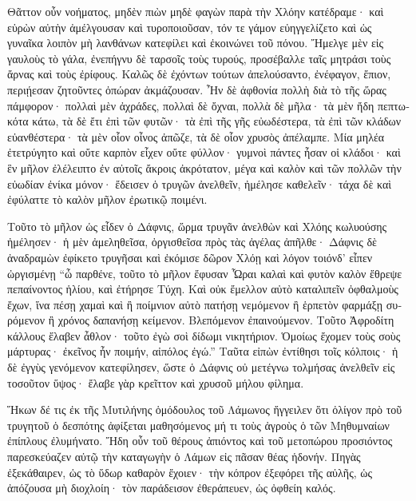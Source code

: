 \documentclass{book}
\begin{document}
\begin{pairs}
\begin{Leftside}
\begin{greek}
  Θᾶττον οὖν νοήματος, μηδὲν πιὼν μηδὲ φαγὼν παρὰ τὴν Χλόην κατέδραμε· καὶ εὑρὼν αὐτὴν ἀμέλγουσαν καὶ τυροποιοῦσαν, τόν τε γάμον εὐηγγελίζετο καὶ ὡς γυναῖκα λοιπὸν μὴ λανθάνων κατεφίλει καὶ ἐκοινώνει τοῦ πόνου.  Ἤμελγε μὲν εἰς γαυλοὺς τὸ γάλα, ἐνεπήγνυ δὲ ταρσοῖς τοὺς τυρούς, προσέβαλλε ταῖς μητράσι τοὺς ἄρνας καὶ τοὺς ἐρίφους. Καλῶς δὲ ἐχόντων τούτων ἀπελούσαντο, ἐνέφαγον,  ἔπιον, περιῄεσαν ζητοῦντες ὀπώραν ἀκμάζουσαν. Ἦν δὲ ἀφθονία πολλὴ διὰ τὸ τῆς ὥρας πάμφορον· πολλαὶ μὲν ἀχράδες, πολλαὶ δὲ ὄχναι, πολλὰ δὲ μῆλα· τὰ μὲν ἤδη πεπτωκότα κάτω, τὰ δὲ ἔτι ἐπὶ τῶν φυτῶν· τὰ ἐπὶ τῆς γῆς εὐωδέστερα, τὰ ἐπὶ τῶν κλάδων εὐανθέστερα· τὰ μὲν οἷον οἶνος ἀπῶζε, τὰ δὲ οἷον χρυσὸς ἀπέλαμπε.  Μία μηλέα ἐτετρύγητο καὶ οὔτε καρπὸν εἶχεν οὔτε φύλλον· γυμνοὶ πάντες ἦσαν οἱ κλάδοι· καὶ ἓν μῆλον ἐλέλειπτο ἐν αὐτοῖς ἄκροις ἀκρότατον, μέγα καὶ καλὸν καὶ τῶν πολλῶν τὴν εὐωδίαν ἐνίκα μόνον· ἔδεισεν ὁ τρυγῶν ἀνελθεῖν, ἠμέλησε καθελεῖν· τάχα δὲ καὶ ἐφύλαττε τὸ καλὸν μῆλον ἐρωτικῷ ποιμένι.
\pend


  Τοῦτο τὸ μῆλον ὡς εἶδεν ὁ Δάφνις, ὥρμα τρυγᾶν ἀνελθὼν καὶ Χλόης κωλυούσης ἠμέλησεν· ἡ μὲν ἀμεληθεῖσα, ὀργισθεῖσα πρὸς τὰς ἀγέλας ἀπῆλθε· Δάφνις δὲ ἀναδραμὼν ἐφίκετο τρυγῆσαι καὶ ἐκόμισε δῶρον Χλόῃ καὶ λόγον τοιόνδ’ εἶπεν ὠργισμένῃ “ὦ παρθένε, τοῦτο τὸ μῆλον ἔφυσαν Ὧραι καλαὶ καὶ φυτὸν καλὸν ἔθρεψε πεπαίνοντος ἡλίου, καὶ ἐτήρησε Τύχη.  Καὶ οὐκ ἔμελλον αὐτὸ καταλιπεῖν ὀφθαλμοὺς ἔχων, ἵνα πέσῃ χαμαὶ καὶ ἢ ποίμνιον αὐτὸ πατήσῃ νεμόμενον ἢ ἑρπετὸν φαρμάξῃ συρόμενον ἢ χρόνος δαπανήσῃ κείμενον. Βλεπόμενον ἐπαινούμενον. Τοῦτο Ἀφροδίτη κάλλους ἔλαβεν ἆθλον·  τοῦτο ἐγὼ σοὶ δίδωμι νικητήριον. Ὁμοίως ἔχομεν τοὺς σοὺς μάρτυρας· ἐκεῖνος ἦν ποιμήν, αἰπόλος ἐγώ.” Ταῦτα εἰπὼν ἐντίθησι τοῖς κόλποις· ἡ δὲ ἐγγὺς γενόμενον κατεφίλησεν, ὥστε ὁ Δάφνις οὐ μετέγνω τολμήσας ἀνελθεῖν εἰς τοσοῦτον ὕψος· ἔλαβε γὰρ κρεῖττον καὶ χρυσοῦ μήλου φίλημα.
\pend


  Ἥκων δέ τις ἐκ τῆς Μυτιλήνης ὁμόδουλος τοῦ Λάμωνος ἤγγειλεν ὅτι ὀλίγον πρὸ τοῦ τρυγητοῦ ὁ δεσπότης ἀφίξεται μαθησόμενος μή τι τοὺς ἀγροὺς ὁ τῶν Μηθυμναίων ἐπίπλους ἐλυμήνατο.  Ἤδη οὖν τοῦ θέρους ἀπιόντος καὶ τοῦ μετοπώρου προσιόντος παρεσκεύαζεν αὐτῷ τὴν καταγωγὴν ὁ Λάμων εἰς πᾶσαν θέας ἡδονήν.  Πηγὰς ἐξεκάθαιρεν, ὡς τὸ ὕδωρ καθαρὸν ἔχοιεν· τὴν κόπρον ἐξεφόρει τῆς αὐλῆς, ὡς ἀπόζουσα μὴ διοχλοίη· τὸν παράδεισον ἐθεράπευεν, ὡς ὀφθείη καλός.
\pend



\end{greek}
\end{Leftside}
\end{pairs}
\end{document}
